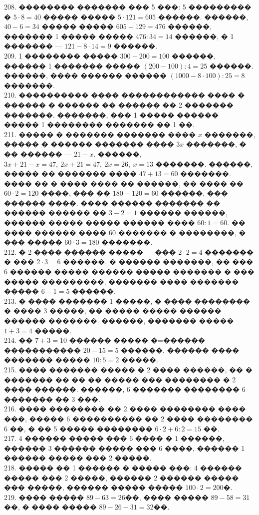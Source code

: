 \documentclass[12pt]{article}
\begin{document}
208. �������� ������� ��� 5 ���: 5 ��������� � $5\cdot8=40$ ����� ����� $5\cdot121=605$ ������. ������, $40-6=34$ ����� ����� $605-129=476$ ������, ������� 1 ����� ����� $476:34=14$ ������, � 1 ������� --- $121-8\cdot14=9$ ������.\\
209. 1 �������� ����� $300-200=100$ ������, ������ 1 ������� ����� $(200-100):4=25$ ������. ������, ���� ������ ������ $(1000-8\cdot100):25=8$ �������.\\
210. ���������� ���� ������������ ���� � ������ � ������ �� ������ �� 2 ������� �������. �������, ��� 1 ����� ������ ����� 1 �������� ������� �� 1 ��.\\
211. ����� � ������� ������� ���� $x$ �������, ����� � ������ ������� ���� $3x$ �������, � �� ������ --- $21-x.$ ������, $3x+21-x=47,\ 2x+21=47,\ 2x=26,\ x=13$ �������. ������, ����� �� ������� ���� $47+13=60$ �������. ���� �� � ���� ���� �� ������, �� ���� �� $60\cdot2=120$ ����, ��� �� $180-120=60$ ������, ��� ������ ����. ���� ������ ������� �� ������ ������ �� $3-2=1$ ������ ������, ������ ����� ����� ������ ���� $60:1=60.$ �� ���� ������ ���� 60 ������� � ��������, � ��� ����� $60\cdot3=180$ �������.\\
212. � 2 ���� ������ ����� --- ��� $2\cdot2=4$ ������� � ��� $2\cdot3=6$ ������. � ������ �������, �� ��� 6 ������ ����� ������ ����� ������� � ��� ����� ���������, ������� ���� ������� ����� $6-1=5$ ������.\\
213. � ���� ������� 1 �����, � ���� �������� � ���� 3 �����, �� ����� ����� ������ ������ �������. ������, ������� ����� $1+3=4$ �����.\\
214. �� $7+3=10$ ������ ����� �=������ �����������  $20-15=5$ ������, ������ ���� ������� ����� $10:5=2$ �����.\\
215. ���� ������� ����� � 2 ���� ������, �� � ������� �� �� �� ����� ��� �������� � 2 ���� ������. ������, 6 ������� �������� 6 ������� �� 3 ���.\\
216. ���� �������� �� 2 ���� �������� ���� ���, ����� 6 ���������� �� 2 ���� �������� 6 ��, � �� 5 ����� �������� $6\cdot2+6:2=15$ ��.\\
217. 4 ������ ����� ��� 6 ���� � 1 ������, ������ 3 ������ ����� ��� 6 ����, ������ 1 ������ ����� ��� 2 �����.\\
218. ����� �� 1 ������ � ����� ���: 4 ������ ����� ��� 2 �����, ������ 2 ������ ����� ��� �����, ������ ����� ����� $100\cdot2=200$�.\\
219. ���� ����� $89-63=26$��, ���� ����� $89-58=31$��, � ���� ����� $89-26-31=32$��.\\
\end{document}
